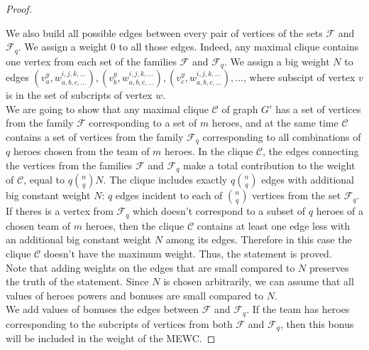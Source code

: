 \documentclass[smallextended]{svjour3}       %
\begin{document}
\begin{proof}
\begin{itemize}
    \end {itemize}
    We also build all possible edges between every pair of vertices of the sets $ \mathcal{F} $ and $ \mathcal{F}_q $. We assign a weight $0$ to all those edges. Indeed, any maximal clique contains one vertex from each set of the families $\mathcal{F}$ and $\mathcal{F}_q$.
    We assign a big weight $N$ to edges $ (v_a^y, w_{a, b, c, ...}^ {i, j, k, ...}), (v_b^y, w_{a, b, c , ...}^{i, j, k, ...}),(v_c^y, w_{a, b, c , ...}^{i, j, k, ...}),... $, where subscipt of vertex $v$ is in the set of subcripts of vertex $w$.\\
    We are going to show that any maximal clique $\mathcal{C}$ of graph $G'$ has a set of vertices from the family $\mathcal{F}$ corresponding to a set of $m$ heroes, and at the same time $\mathcal{C}$ contains a set of vertices from the family $ \mathcal{F}_q $ corresponding to all combinations of $q$ heroes chosen from the team of $m$ heroes.
    In the clique $\mathcal{C}$, the edges connecting the vertices from the families $ \mathcal{F} $ and $ \mathcal{F}_q $ make a total contribution to the weight of $\mathcal{C}$, equal to $ q \binom{n}{q} N $.
    The clique includes exactly $ q \binom{n}{q} $ edges with additional big constant weight $N$: $q$ edges incident to each of $\binom{n}{q}$ vertices from the set $ \mathcal {F}_q $.
    If theres is a vertex from $ \mathcal{F}_q $ which doesn't correspond to a subset of $q$ heroes of a chosen team of $m$ heroes, then the clique $\mathcal{C}$ contains at least one edge less with an additional big constant weight $ N $ among its edges.
    Therefore in this case the clique $\mathcal{C}$ doesn't have the maximum weight. Thus, the statement is proved. \\
    Note that adding weights on the edges that are small compared to $N$ preserves the truth of the statement. Since $N$ is chosen arbitrarily, we can assume that all values of heroes powers and bonuses are small compared to $N$.\\
	We add values of bonuses the edges between $\mathcal{F} $ and $ \mathcal{F}_q $. If the team has heroes corresponding to the subcripts of vertices from both $ \mathcal {F}$ and $ \mathcal {F}_q $, then this bonus will be included in the weight of the MEWC.

\end{proof}
\end{document}

